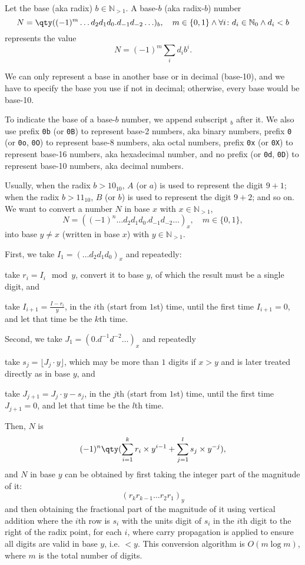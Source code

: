 \documentclass[a4paper,12pt]{report}
\begin{document}
Let the base (aka radix) $b\in\mathbb{N}_{>1}$. A base-$b$ (aka radix-$b$) number
\[N=\qty((-1)^m\ldots d_2d_1d_0.d_{-1}d_{-2}\ldots)_b,\quad m\in\{0,1\}\land\forall i\colon d_i\in\mathbb{N}_0\land d_i<b\]
represents the value
\[N =(-1)^m\sum_id_ib^i.\]

We can only represent a base in another base or in decimal (base-10), and we have to specify the base you use if not in decimal; otherwise, every base would be base-10.

To indicate the base of a base-$b$ number, we append subscript $_b$ after it. We also use prefix \verb|0b| (or \verb|0B|) to represent base-2 numbers, aka binary numbers, prefix \verb|0| (or \verb|0o|, \verb|0O|) to represent base-8 numbers, aka octal numbers, prefix \verb|0x| (or \verb|0X|) to represent base-16 numbers, aka hexadecimal number, and no prefix (or \verb|0d|, \verb|0D|) to represent base-10 numbers, aka decimal numbers.

Usually, when the radix $b>10_{10}$, $A$ (or $a$) is used to represent the digit $9+1$; when the radix $b>11_{10}$, $B$ (or $b$) is used to represent the digit $9+2$; and so on.
We want to convert a number $N$ in base $x$ with $x\in\mathbb{N}_{>1}$,
\[N=((-1)^n\ldots d_2d_1d_0.d_{-1}d_{-2}\ldots)_x,\quad m\in\{0,1\},\]
into base $y\neq x$ (written in base $x$) with $y\in\mathbb{N}_{>1}$.
\ben
\item First, we take $I_1=(\ldots d_2d_1d_0)_x$ and repeatedly:
\ben
\item take $r_i=I_i\mod y$, convert it to base $y$, of which the result must be a single digit, and
\item take $I_{i+1}=\frac{I-r_i}{y}$,
\een
in the $i$th (start from $1$st) time, until the first time $I_{i+1}=0$, and let that time be the $k$th time.
\item Second, we take $J_1=(0.d^{-1}d^{-2}\ldots)_x$ and repeatedly
\ben
\item take $s_j=\lfloor J_j\cdot y\rfloor$, which may be more than $1$ digits if $x>y$ and is later treated directly as in base $y$, and
\item take $J_{j+1}=J_j\cdot y-s_j$,
\een
in the $j$th (start from $1$st) time, until the first time $J_{j+1}=0$, and let that time be the $l$th time.
\item Then, $N$ is
\[(-1)^n\qty(\sum_{i=1}^kr_i\times y^{i-1}+\sum_{j=1}^ls_j\times y^{-j}),\]
and $N$ in base $y$ can be obtained by first taking the integer part of the magnitude of it:
\[(r_kr_{k-1}\ldots r_2r_1)_y\]
and then obtaining the fractional part of the magnitude of it using vertical addition where the $i$th row is $s_i$ with the units digit of $s_i$ in the $i$th digit to the right of the radix point, for each $i$, where carry propagation is applied to ensure all digits are valid in base $y$, i.e. $<y$.
\een
This conversion algorithm is $O(m\log m)$, where $m$ is the total number of digits.
\end{document}
